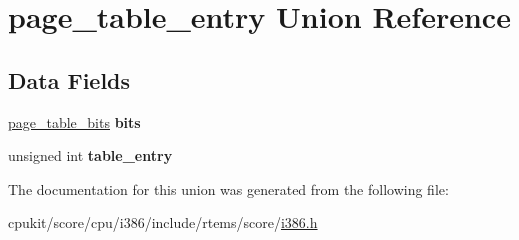 \hypertarget{unionpage__table__entry}{}\section{page\+\_\+table\+\_\+entry Union Reference}
\label{unionpage__table__entry}
\subsection*{Data Fields}
\begin{DoxyCompactItemize}
\item 
\mbox{\label{unionpage__table__entry_ab064af3fd3508cf2a82a7ec45c1ba5be}} 
\mbox{\hyperlink{structpage__table__bits}{page\+\_\+table\+\_\+bits}} {\bfseries bits}
\item 
\mbox{\label{unionpage__table__entry_a2ed7bd8766e6a4f4a53fe195a4461d83}} 
unsigned int {\bfseries table\+\_\+entry}
\end{DoxyCompactItemize}


The documentation for this union was generated from the following file\+:\begin{DoxyCompactItemize}
\item 
cpukit/score/cpu/i386/include/rtems/score/\mbox{\hyperlink{i386_8h}{i386.\+h}}\end{DoxyCompactItemize}
